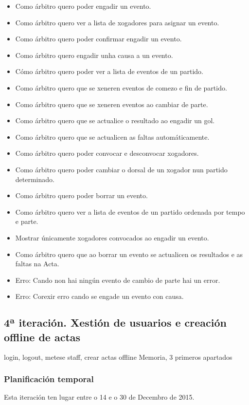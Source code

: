         \begin{itemize}
          \item Como árbitro quero poder engadir un evento.
          \item Como árbitro quero ver a lista de xogadores para asignar un 
evento.
          \item Como árbitro quero poder confirmar engadir un evento.
          \item Como árbitro quero engadir unha causa a un evento.
          \item Cómo árbitro quero poder ver a lista de eventos de un partido.
          \item Como árbitro quero que se xeneren eventos de comezo e fin de 
partido.
          \item Como árbitro quero que se xeneren eventos ao cambiar de parte.
          \item Como árbitro quero que se actualice o resultado ao engadir un 
gol.
          \item Como árbitro quero que se actualicen as faltas automáticamente.
          \item Como árbitro quero poder convocar e desconvocar xogadores.
          \item Como árbitro quero poder cambiar o dorsal de un xogador nun 
partido determinado.
          \item Como árbitro quero poder borrar un evento.
          \item Como árbitro quero ver a lista de eventos de un partido 
ordenada por tempo e parte.
          \item Mostrar únicamente xogadores convocados ao engadir un evento.
          \item Como árbitro quero que ao borrar un evento se actualicen os 
resultados e as faltas na Acta.
          \item Erro: Cando non hai ningún evento de cambio de parte hai un 
error.
          \item Erro: Corexir erro cando se engade un evento con causa.
        \end{itemize}

    \subsection{4ª iteración. Xestión de usuarios e creación offline de actas}
    
    login, logout, metese staff, crear actas offline
    Memoria, 3 primeros apartados
      \subsubsection{Planificación temporal}
      Esta iteración ten lugar entre o 14 e o 30 de Decembro de 2015.

